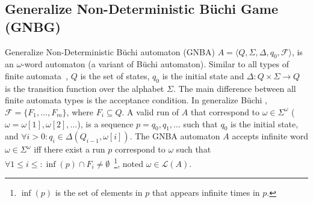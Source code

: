 \documentclass[ twoside, 12pt ]{article}
\newcommand{\commentOut}[1]{}
\newcommand{\buchi}{B\"uchi }
\begin{document}
\commentOut{

}


\subsection{Generalize Non-Deterministic \buchi Game (GNBG)}
\label{sec:GNBG}

Generalize Non-Deterministic \buchi automaton (GNBA) $A= \langle Q,\Sigma,\Delta,q_0,\mathcal{F} \rangle $, is an $\omega$-word automaton (a variant of \buchi automaton).
Similar to all types of finite automata~\cite{sipser2006introduction}, $Q$ is the set of states, $q_0$ is the initial state and $\Delta : Q \times \Sigma \xrightarrow{} Q$ is the transition function over the alphabet $\Sigma$.
The main difference between all finite automata types is the acceptance condition.
In generalize \buchi, $\mathcal{F} = \{ F_1 , \dots , F_m \}$, where $F_i \subseteq Q$.
A valid run of $A$ that correspond to $\omega \in \Sigma^\omega$ ($\omega = \omega[1], \omega[2], \dots$), is a sequence $p=q_0,q_1, \dots$ such that $q_0$ is the initial state, and $\forall i>0 : q_i \in \Delta(Q_{i-1}, \omega[i])$.
The GNBA automaton $A$ accepts infinite word $\omega \in \Sigma^\omega$ iff there exist a run $p$ correspond to $\omega$ such that $\forall 1 \le i \le : \inf(p) \cap F_i \neq \emptyset$~\footnote{$\inf(p)$ is the set of elements in $p$ that appears infinite times in $p$.}, noted $\omega \in \mathcal{L}(A)$.
\end{document}
